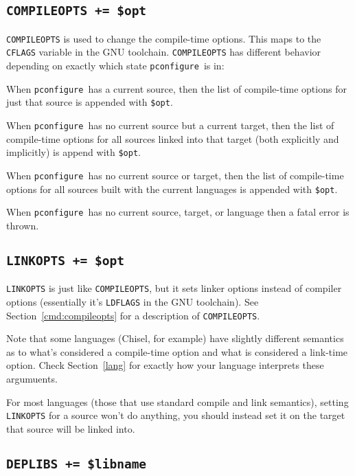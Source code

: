 \documentclass{article}
\newcommand{\pconfigure}{\texttt{pconfigure}}
\begin{document}
\subsection{\texttt{COMPILEOPTS += \$opt} \label{cmd:compileopts}}

\texttt{COMPILEOPTS} is used to change the compile-time options.  This
maps to the \texttt{CFLAGS} variable in the GNU toolchain.
\texttt{COMPILEOPTS} has different behavior depending on exactly which
state \pconfigure\ is in:

When \pconfigure\ has a current source, then the list of compile-time
options for just that source is appended with \texttt{\$opt}.

When \pconfigure\ has no current source but a current target, then the
list of compile-time options for all sources linked into that target
(both explicitly and implicitly) is append with \texttt{\$opt}.

When \pconfigure\ has no current source or target, then the list of
compile-time options for all sources built with the current languages
is appended with \texttt{\$opt}.

When \pconfigure\ has no current source, target, or language then a
fatal error is thrown.

\subsection{\texttt{LINKOPTS += \$opt}}

\texttt{LINKOPTS} is just like \texttt{COMPILEOPTS}, but it sets
linker options instead of compiler options (essentially it's
\texttt{LDFLAGS} in the GNU toolchain).  See
Section~\ref{cmd:compileopts} for a description of
\texttt{COMPILEOPTS}.

Note that some languages (Chisel, for example) have slightly different
semantics as to what's considered a compile-time option and what is
considered a link-time option.  Check Section~\ref{lang} for exactly
how your language interprets these argumuents.

For most languages (those that use standard compile and link
semantics), setting \texttt{LINKOPTS} for a source won't do anything,
you should instead set it on the target that source will be linked
into.

\subsection{\texttt{DEPLIBS += \$libname} \label{cmd:deplibs}}
\end{document}
